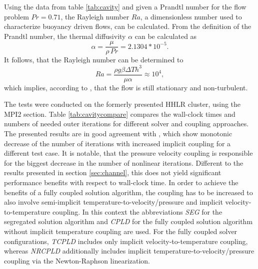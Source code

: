 Using the data from table \ref{tab:cavity} and given a Prandtl number for the flow problem \(Pr = 0.71\), the Rayleigh number \(Ra\), a dimensionless number used to characterize buoyancy driven flows, can be calculated. From the definition of the Prandtl number, the thermal diffusivity \(\alpha\) can be calculated as
\begin{displaymath}
  \alpha = \frac{\mu}{\rho \, Pr} = 2.1304 * 10^{-5}.
\end{displaymath}
It follows, that the Rayleigh number can be determined to 
\begin{displaymath}
  Ra = \frac{\rho g \beta \Delta T h^3}{\mu \alpha} \approx 10^4,
\end{displaymath}
which implies, according to \cite{christon02}, that the flow is still stationary and non-turbulent.

The tests were conducted on the formerly presented HHLR cluster, using the MPI2 section. Table \ref{tab:cavitycompare} compares the wall-clock times and numbers of needed outer iterations for different solver and coupling approaches. The presented results are in good agreement with \cite{vakilipour12}, which show monotonic decrease of the number of iterations with increased implicit coupling for a different test case. It is notable, that the pressure velocity coupling is responsible for the biggest decrease in the number of nonlinear iterations. Different to the results presented in section \ref{sec:channel}, this does not yield significant performance benefits with respect to wall-clock time. In order to achieve the benefits of a fully coupled solution algorithm, the coupling has to be increased to also involve semi-implicit temperature-to-velocity/pressure and implicit velocity-to-temperature coupling. In this context the abbreviations \emph{SEG} for the segregated solution algorithm and \emph{CPLD} for the fully coupled solution algorithm without implicit temperature coupling are used. For the fully coupled solver configurations, \emph{TCPLD} includes only implicit velocity-to-temperature coupling, whereas \emph{NRCPLD} additionally includes implicit temperature-to-velocity/pressure coupling via the Newton-Raphson linearization.

